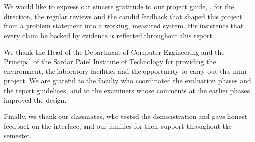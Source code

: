 \section*{}
\vspace{1cm}
We would like to express our sincere gratitude to our project guide, \GuideName, for the direction, the regular reviews and the candid feedback that shaped this project from a problem statement into a working, measured system. His insistence that every claim be backed by evidence is reflected throughout this report.

We thank the Head of the Department of Computer Engineering and the Principal of the Sardar Patel Institute of Technology for providing the environment, the laboratory facilities and the opportunity to carry out this mini project. We are grateful to the faculty who coordinated the evaluation phases and the report guidelines, and to the examiners whose comments at the earlier phases improved the design.

Finally, we thank our classmates, who tested the demonstration and gave honest feedback on the interface, and our families for their support throughout the semester.

\vspace{1.5cm}
\begin{flushright}
\StudentA\\ \StudentB\\ \StudentC
\end{flushright}

